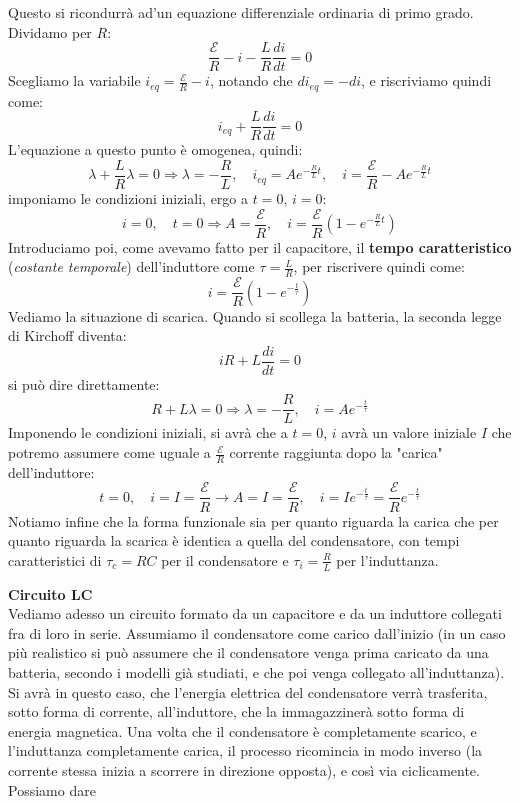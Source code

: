 \documentclass[a4paper,12pt]{article}
\begin{document}
Questo si ricondurrà ad'un equazione differenziale ordinaria di primo grado. Dividamo per $R$:
$$ \frac{\mathcal{E}}{R} - i - \frac{L}{R}\frac{di}{dt} = 0 $$
Scegliamo la variabile $i_{eq} = \frac{\mathcal{E}}{R} - i$, notando che $di_{eq} = -di$, e riscriviamo quindi come:
$$ i_{eq} + \frac{L}{R} \frac{di}{dt} = 0 $$
L'equazione a questo punto è omogenea, quindi:
$$ \lambda + \frac{L}{R} \lambda = 0 \Rightarrow \lambda = -\frac{R}{L}, \quad i_{eq} = Ae^{-\frac{R}{L}t}, \quad i = \frac{\mathcal{E}}{R} - Ae^{-\frac{R}{L}t}$$
imponiamo le condizioni iniziali, ergo a $t = 0$, $i = 0$:
$$ i = 0, \quad t = 0 \Rightarrow A = \frac{\mathcal{E}}{R}, \quad i = \frac{\mathcal{E}}{R}\left( 1 - e^{-\frac{R}{L}t} \right) $$
Introduciamo poi, come avevamo fatto per il capacitore, il \textbf{tempo caratteristico} (\textit{costante temporale}) dell'induttore come $\tau = \frac{L}{R}$, per riscrivere quindi come:
$$ i = \frac{\mathcal{E}}{R}\left( 1 - e^{-\frac{t}{\tau}} \right)$$
Vediamo la situazione di scarica. Quando si scollega la batteria, la seconda legge di Kirchoff diventa:
$$ iR + L\frac{di}{dt} = 0 $$
si può dire direttamente:
$$ R + L\lambda = 0 \Rightarrow \lambda = -\frac{R}{L}, \quad i = Ae^{-\frac{t}{\tau}} $$
Imponendo le condizioni iniziali, si avrà che a $t = 0$, $i$ avrà un valore iniziale $I$ che potremo assumere come uguale a $\frac{\mathcal{E}}{R}$ corrente raggiunta dopo la "carica" dell'induttore:
$$ t = 0,\quad i = I = \frac{\mathcal{E}}{R} \rightarrow A = I = \frac{\mathcal{E}}{R}, \quad i = Ie^{-\frac{t}{\tau}} = \frac{\mathcal{E}}{R} e^{-\frac{t}{\tau}}$$
Notiamo infine che la forma funzionale sia per quanto riguarda la carica che per quanto riguarda la scarica è identica a quella del condensatore, con tempi caratteristici di $\tau_c = RC$ per il condensatore
e $\tau_i = \frac{R}{L}$ per l'induttanza.
\par\smallskip
\textbf{Circuito LC} \\
Vediamo adesso un circuito formato da un capacitore e da un induttore collegati fra di loro in serie. Assumiamo il condensatore
come carico dall'inizio (in un caso più realistico si può assumere che il condensatore venga prima caricato da una batteria, secondo i modelli già
studiati, e che poi venga collegato all'induttanza). Si avrà in questo caso, che l'energia elettrica del condensatore verrà trasferita, sotto forma di corrente,
all'induttore, che la immagazzinerà sotto forma di energia magnetica. Una volta che il condensatore è completamente scarico, e l'induttanza completamente carica,
il processo ricomincia in modo inverso (la corrente stessa inizia a scorrere in direzione opposta), e così via ciclicamente. Possiamo dare
\end{document}

